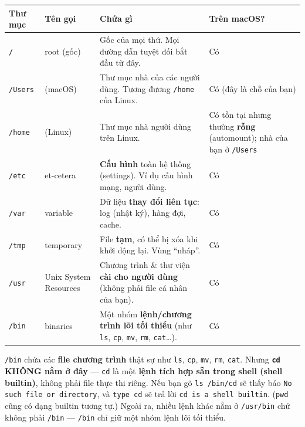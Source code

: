 \documentclass[12pt,a4paper]{article}
\begin{document}
\renewcommand{\arraystretch}{1.4}
\begin{longtable}{>{\raggedright\arraybackslash}p{1.5cm} >{\raggedright\arraybackslash}p{2.8cm} >{\raggedright\arraybackslash}p{6.2cm} >{\raggedright\arraybackslash}p{2.6cm}}
\rowcolor{checkback}
\textbf{Thư mục} & \textbf{Tên gọi} & \textbf{Chứa gì} & \textbf{Trên macOS?} \\
\hline
\endhead
\texttt{/} & root (gốc) & Gốc của mọi thứ. Mọi đường dẫn tuyệt đối bắt đầu từ đây. & Có \\
\texttt{/Users} & (macOS) & Thư mục nhà của các người dùng. Tương đương \texttt{/home} của Linux. & Có (đây là chỗ của bạn) \\
\texttt{/home} & (Linux) & Thư mục nhà người dùng trên Linux. & Có tồn tại nhưng thường \textbf{rỗng} (automount); nhà của bạn ở \texttt{/Users} \\
\texttt{/etc} & et-cetera & \textbf{Cấu hình} toàn hệ thống (settings). Ví dụ cấu hình mạng, người dùng. & Có \\
\texttt{/var} & variable & Dữ liệu \textbf{thay đổi liên tục}: log (nhật ký), hàng đợi, cache. & Có \\
\texttt{/tmp} & temporary & File \textbf{tạm}, có thể bị xóa khi khởi động lại. Vùng ``nháp''. & Có \\
\texttt{/usr} & Unix System Resources & Chương trình \& thư viện \textbf{cài cho người dùng} (không phải file cá nhân của bạn). & Có \\
\texttt{/bin} & binaries & Một nhóm \textbf{lệnh/chương trình lõi tối thiểu} (như \texttt{ls}, \texttt{cp}, \texttt{mv}, \texttt{rm}, \texttt{cat}\ldots). & Có \\
\end{longtable}
\renewcommand{\arraystretch}{1}

\begin{notebox}[title={Lưu ý về \texttt{/bin} và shell builtin}]
\texttt{/bin} chứa các \textbf{file chương trình} thật sự như \texttt{ls}, \texttt{cp}, \texttt{mv}, \texttt{rm}, \texttt{cat}. Nhưng \textbf{\texttt{cd} KHÔNG nằm ở đây} --- \texttt{cd} là một \textbf{lệnh tích hợp sẵn trong shell (shell builtin)}, không phải file thực thi riêng. Nếu bạn gõ \texttt{ls /bin/cd} sẽ thấy báo \texttt{No such file or directory}, và \texttt{type cd} sẽ trả lời \texttt{cd is a shell builtin}. (\texttt{pwd} cũng có dạng builtin tương tự.) Ngoài ra, nhiều lệnh khác nằm ở \texttt{/usr/bin} chứ không phải \texttt{/bin} --- \texttt{/bin} chỉ giữ một nhóm lệnh lõi tối thiểu.
\end{notebox}
\end{document}

